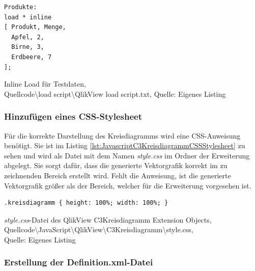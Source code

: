 \ifIncludeFigures\begin{listing}[htbp]
\begin{verbatim}
Produkte:
load * inline
[ Produkt, Menge,
  Apfel, 2,
  Birne, 3,
  Erdbeere, 7
];
\end{verbatim}
\caption[Inline Load für Testdaten]{Inline Load für Testdaten, \\Quellcode\textbackslash{}load script\textbackslash{}QlikView load script.txt, Quelle: Eigenes Listing}
\label{lst:InlineLoadFuerTestdaten}
\end{listing}\fi

\subsubsection{Hinzufügen eines CSS-Stylesheet}
\label{lab:HinzufügenEinesCSSStylesheet}

Für die korrekte Darstellung des Kreis\-diagramms wird eine CSS-Anweisung benötigt. Sie ist im Listing \ref{lst:JavascriptC3KreisdiagrammCSSStylesheet} zu sehen und wird als Datei mit dem Namen \textit{style.css} im Ordner der Erweiterung abgelegt. Sie sorgt dafür, dass die generierte Vektorgrafik korrekt im zu zeichnenden Bereich erstellt wird. Fehlt die Anweisung, ist die generierte Vektorgrafik größer als der Bereich, welcher für die Erweiterung vorgesehen ist.

\ifIncludeFigures\begin{listing}[htbp]
\begin{verbatim}
.kreisdiagramm { height: 100%; width: 100%; }
\end{verbatim}
\caption[\textit{style.css}-Datei des QlikView C3Kreisdiagramm Extension Objects]{\textit{style.css}-Datei des QlikView C3Kreisdiagramm Extension Objects, \\Quellcode\textbackslash{}JavaScript\textbackslash{}QlikView\textbackslash{}C3Kreisdiagramm\textbackslash{}style.css, \\Quelle: Eigenes Listing}
\label{lst:JavascriptC3KreisdiagrammCSSStylesheet}
\end{listing}\fi

\subsubsection{Erstellung der Definition.xml-Datei}

